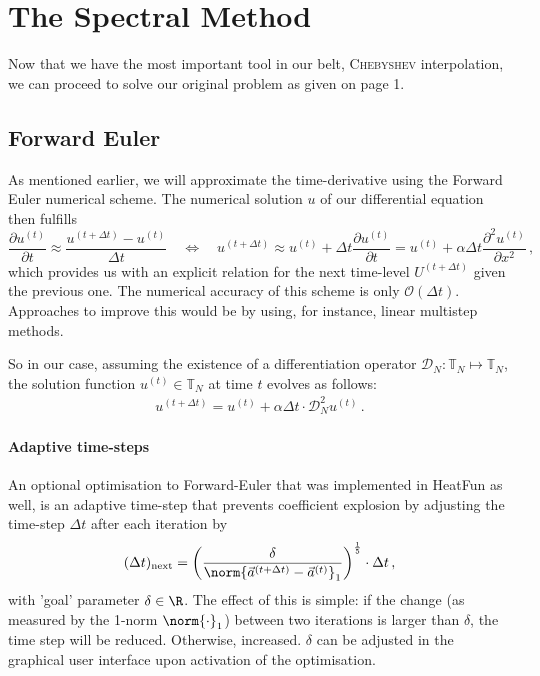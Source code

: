 \documentclass[12pt, a4paper]{article}
\newcommand{\chebyshev}{\textsc{Chebyshev}\xspace}
\newcommand{\heatfun}{\textcolor{themecolor3}{HeatFun}\xspace}
\begin{document}
  \section{The Spectral Method}
  Now that we have the most important tool in our belt, \chebyshev interpolation, we can proceed to solve our original problem as given on page 1.

  \subsection{Forward Euler}
  As mentioned earlier, we will approximate the time-derivative using the Forward Euler numerical scheme.
  The numerical solution $u$ of our differential equation then fulfills
  $$\frac{\partial u^{(t)}}{\partial t} \approx \frac{u^{(t+\Delta t)} - u^{(t)}}{\Delta t} \quad\Leftrightarrow\quad u^{(t+\Delta t)} \approx u^{(t)} + \Delta t \frac{\partial u^{(t)}}{\partial t} = u^{(t)} + \alpha \Delta t \frac{\partial^2 u^{(t)}}{\partial x^2} \,,$$
  which provides us with an explicit relation for the next time-level $U^{(t+\Delta t)}$ given the previous one.
  The numerical accuracy of this scheme is only $\mathcal{O}(\Delta t)$.
  Approaches to improve this would be by using, for instance, linear multistep methods.

  So in our case, assuming the existence of a differentiation operator $\mathcal{D}_N: \mathbb{T}_N \mapsto \mathbb{T}_N$, the solution function $u^{(t)} \in \mathbb{T}_N$ at time $t$ evolves as follows:
  \begin{align*}
    u^{(t+\Delta t)} = u^{(t)} + \alpha \Delta t \cdot \mathcal{D}_N^2 u^{(t)} \,.
  \end{align*}

  \paragraph{Adaptive time-steps}
  An optional optimisation to Forward-Euler that was implemented in \heatfun as well, is an adaptive time-step that prevents coefficient explosion by adjusting the time-step $\Delta t$ after each iteration by
  $$(\Delta t)_{\text{next}} = \left(\frac{\delta}{\norm{\vec{a}^{(t+\Delta t)} - \vec{a}^{(t)}}_1}\right)^{\frac{1}{5}} \cdot \Delta t \,,$$
  with 'goal' parameter $\delta \in \R$.
  The effect of this is simple: if the change (as measured by the 1-norm $\norm{\cdot}_1$) between two iterations is larger than $\delta$, the time step will be reduced. Otherwise, increased.
  $\delta$ can be adjusted in the graphical user interface upon activation of the optimisation.
\end{document}
